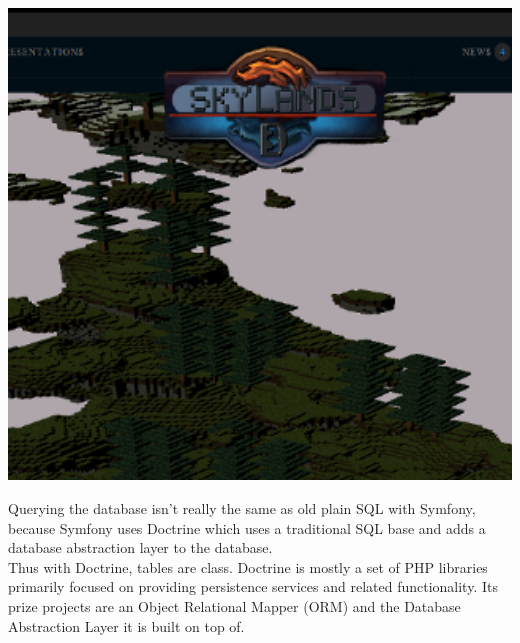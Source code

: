 \documentclass[article]{report}         %
\begin{document}
				\includegraphics[width = 17cm]{images/website.png}
				
\bigskip
				Querying the database isn't really the same as old plain SQL with Symfony, because Symfony uses Doctrine which uses a traditional SQL base and adds a database
abstraction layer to the database.\\
 Thus with Doctrine, tables are class. Doctrine is mostly a set of PHP libraries primarily focused on providing persistence services and related functionality. Its prize projects are an Object Relational Mapper (ORM) and the Database Abstraction Layer it is built on top of.\\
\end{document}
